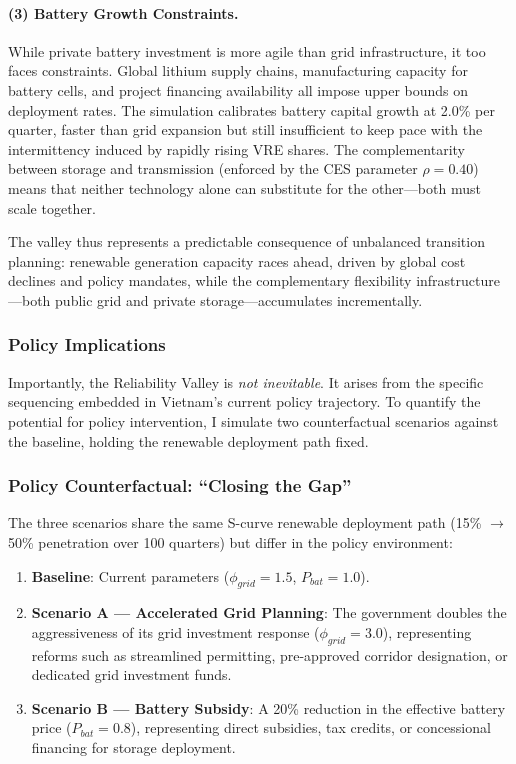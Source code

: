 \documentclass[12pt, a4paper]{article}
\begin{document}
\paragraph{(3) Battery Growth Constraints.} While private battery investment is more agile than grid infrastructure, it too faces constraints. Global lithium supply chains, manufacturing capacity for battery cells, and project financing availability all impose upper bounds on deployment rates. The simulation calibrates battery capital growth at 2.0\% per quarter, faster than grid expansion but still insufficient to keep pace with the intermittency induced by rapidly rising VRE shares. The complementarity between storage and transmission (enforced by the CES parameter $\rho = 0.40$) means that neither technology alone can substitute for the other---both must scale together.

The valley thus represents a predictable consequence of unbalanced transition planning: renewable generation capacity races ahead, driven by global cost declines and policy mandates, while the complementary flexibility infrastructure---both public grid and private storage---accumulates incrementally.

\subsubsection{Policy Implications}

Importantly, the Reliability Valley is \textit{not inevitable}. It arises from the specific sequencing embedded in Vietnam's current policy trajectory. To quantify the potential for policy intervention, I simulate two counterfactual scenarios against the baseline, holding the renewable deployment path fixed.

\subsubsection{Policy Counterfactual: ``Closing the Gap''}

The three scenarios share the same S-curve renewable deployment path (15\% $\to$ 50\% penetration over 100 quarters) but differ in the policy environment:

\begin{enumerate}
    \item \textbf{Baseline}: Current parameters ($\phi_{grid} = 1.5$, $P_{bat} = 1.0$).
    \item \textbf{Scenario A --- Accelerated Grid Planning}: The government doubles the aggressiveness of its grid investment response ($\phi_{grid} = 3.0$), representing reforms such as streamlined permitting, pre-approved corridor designation, or dedicated grid investment funds.
    \item \textbf{Scenario B --- Battery Subsidy}: A 20\% reduction in the effective battery price ($P_{bat} = 0.8$), representing direct subsidies, tax credits, or concessional financing for storage deployment.
\end{enumerate}
\end{document}
